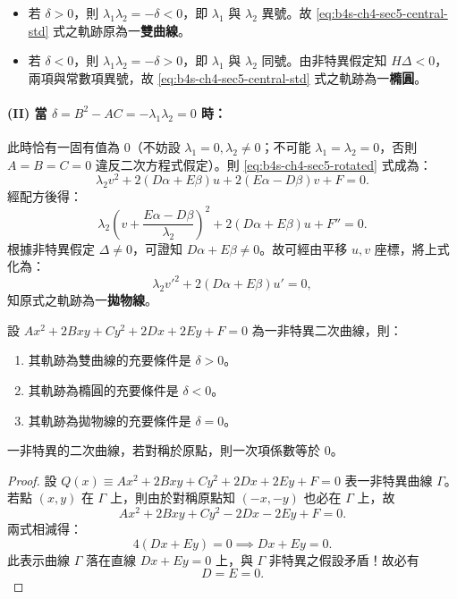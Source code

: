\begin{itemize}
  \item 若 $\delta > 0$，則 $\lambda_1 \lambda_2 = -\delta < 0$，即 $\lambda_1$ 與 $\lambda_2$ 異號。故 \eqref{eq:b4s-ch4-sec5-central-std} 式之軌跡原為一\textbf{雙曲線}。
  \item 若 $\delta < 0$，則 $\lambda_1 \lambda_2 = -\delta > 0$，即 $\lambda_1$ 與 $\lambda_2$ 同號。由非特異假定知 $H\Delta < 0$，兩項與常數項異號，故 \eqref{eq:b4s-ch4-sec5-central-std} 式之軌跡為一\textbf{橢圓}。
\end{itemize}

\paragraph*{(II) 當 $\delta = B^2 - AC = -\lambda_1 \lambda_2 = 0$ 時：}
此時恰有一固有值為 0（不妨設 $\lambda_1 = 0, \lambda_2 \ne 0$；不可能 $\lambda_1 = \lambda_2 = 0$，否則 $A = B = C = 0$ 違反二次方程式假定）。則 \eqref{eq:b4s-ch4-sec5-rotated} 式成為：
\[
\lambda_2 v^2 + 2(D\alpha + E\beta)u + 2(E\alpha - D\beta)v + F = 0.
\]
經配方後得：
\[
\lambda_2 \left( v + \frac{E\alpha - D\beta}{\lambda_2} \right)^2 + 2(D\alpha + E\beta)u + F'' = 0.
\]
根據非特異假定 $\Delta \ne 0$，可證知 $D\alpha + E\beta \ne 0$。故可經由平移 $u, v$ 座標，將上式化為：
\[
\lambda_2 {v'}^2 + 2(D\alpha + E\beta)u' = 0,
\]
知原式之軌跡為一\textbf{拋物線}。

\begin{theorem}[二次曲線分類定理]
設 $Ax^2 + 2Bxy + Cy^2 + 2Dx + 2Ey + F = 0$ 為一非特異二次曲線，則：
\begin{enumerate}[(1)]
  \item 其軌跡為雙曲線的充要條件是 $\delta > 0$。
  \item 其軌跡為橢圓的充要條件是 $\delta < 0$。
  \item 其軌跡為拋物線的充要條件是 $\delta = 0$。
\end{enumerate}
\end{theorem}

\begin{discussion}
一非特異的二次曲線，若對稱於原點，則一次項係數等於 0。
\end{discussion}

\begin{proof}
設 $Q(x) \equiv Ax^2 + 2Bxy + Cy^2 + 2Dx + 2Ey + F = 0$ 表一非特異曲線 $\Gamma$。若點 $(x, y)$ 在 $\Gamma$ 上，則由於對稱原點知 $(-x, -y)$ 也必在 $\Gamma$ 上，故
\[
Ax^2 + 2Bxy + Cy^2 - 2Dx - 2Ey + F = 0.
\]
兩式相減得：
\[
4(Dx + Ey) = 0 \implies Dx + Ey = 0.
\]
此表示曲線 $\Gamma$ 落在直線 $Dx + Ey = 0$ 上，與 $\Gamma$ 非特異之假設矛盾！故必有
\[
D = E = 0.
\]
\end{proof}

